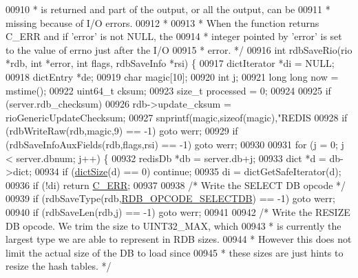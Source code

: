 \begin{DoxyCode}
{{{{{{{{00910 \textcolor{comment}{ * is returned and part of the output, or all the output, can be}
00911 \textcolor{comment}{ * missing because of I/O errors.}
00912 \textcolor{comment}{ *}
00913 \textcolor{comment}{ * When the function returns C\_ERR and if 'error' is not NULL, the}
00914 \textcolor{comment}{ * integer pointed by 'error' is set to the value of errno just after the I/O}
00915 \textcolor{comment}{ * error. */}
00916 \textcolor{keywordtype}{int} rdbSaveRio(rio *rdb, \textcolor{keywordtype}{int} *error, \textcolor{keywordtype}{int} flags, rdbSaveInfo *rsi) \{
00917     dictIterator *di = NULL;
00918     dictEntry *de;
00919     \textcolor{keywordtype}{char} magic[10];
00920     \textcolor{keywordtype}{int} j;
00921     \textcolor{keywordtype}{long} \textcolor{keywordtype}{long} now = mstime();
00922     uint64\_t cksum;
00923     size\_t processed = 0;
00924 
00925     \textcolor{keywordflow}{if} (server.rdb\_checksum)
00926         rdb->update\_cksum = rioGenericUpdateChecksum;
00927     snprintf(magic,\textcolor{keyword}{sizeof}(magic),\textcolor{stringliteral}{"REDIS%
00928     \textcolor{keywordflow}{if} (rdbWriteRaw(rdb,magic,9) == -1) \textcolor{keywordflow}{goto} werr;
00929     \textcolor{keywordflow}{if} (rdbSaveInfoAuxFields(rdb,flags,rsi) == -1) \textcolor{keywordflow}{goto} werr;
00930 
00931     \textcolor{keywordflow}{for} (j = 0; j < server.dbnum; j++) \{
00932         redisDb *db = server.db+j;
00933         dict *d = db->dict;
00934         \textcolor{keywordflow}{if} (\hyperlink{dict_8h_af193430dd3d5579a52b194512f72c1f0}{dictSize}(d) == 0) \textcolor{keywordflow}{continue};
00935         di = dictGetSafeIterator(d);
00936         \textcolor{keywordflow}{if} (!di) \textcolor{keywordflow}{return} \hyperlink{server_8h_af98ac28d5f4d23d7ed5985188e6fb7d1}{C\_ERR};
00937 
00938         \textcolor{comment}{/* Write the SELECT DB opcode */}
00939         \textcolor{keywordflow}{if} (rdbSaveType(rdb,\hyperlink{rdb_8h_a08e0489a0baf79997ee8411e850d6c70}{RDB\_OPCODE\_SELECTDB}) == -1) \textcolor{keywordflow}{goto} werr;
00940         \textcolor{keywordflow}{if} (rdbSaveLen(rdb,j) == -1) \textcolor{keywordflow}{goto} werr;
00941 
00942         \textcolor{comment}{/* Write the RESIZE DB opcode. We trim the size to UINT32\_MAX, which}
00943 \textcolor{comment}{         * is currently the largest type we are able to represent in RDB sizes.}
00944 \textcolor{comment}{         * However this does not limit the actual size of the DB to load since}
00945 \textcolor{comment}{         * these sizes are just hints to resize the hash tables. */}
}}}}}}}}}
\end{DoxyCode}
